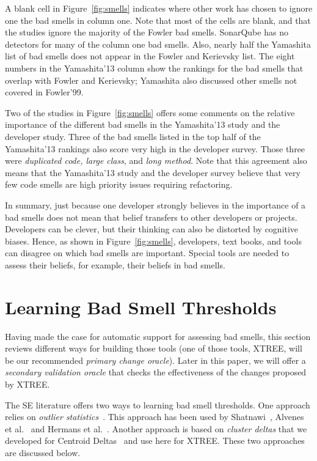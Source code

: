 \documentclass[twocolumn,5p]{elsarticle}
\newcommand{\fig}[1]{Figure~\ref{fig:#1}}
\theoremstyle{break}
\begin{document}
   
   


A  blank cell in \fig{smells}
indicates where   other work has chosen to ignore
one the   bad smells in column one. 
Note that most of the cells are blank, and that the studies ignore the majority of the Fowler bad smells.
SonarQube has no detectors for many of the column one bad smells.
Also, nearly half the Yamashita list of bad smells
    does not appear in the Fowler and Kerievsky list. The eight numbers
    in the  Yamashita'13 column show the rankings for the bad smells 
    that overlap with Fowler and Kerievsky; Yamashita also discussed other smells not covered in Fowler'99.
    

Two of the studies in \fig{smells} offers some comments on the relative importance
of the different bad smells in the Yamashita'13 study and the developer study. Three of the bad smells listed in the top half of the Yamashita'13 rankings also score very high in the developer survey. Those three were {\em duplicated code, large class}, 
        and {\em long method}. 
 Note that this agreement also means that the
  Yamashita'13 study and the developer survey   
  believe
        that very few  code smells are   high priority issues
        requiring refactoring. 
        
In summary, just because one developer strongly believes in the importance of a bad smells does not mean that belief transfers to other developers or projects.
Developers can be clever, but their thinking can also be distorted
by cognitive biases.
Hence, as shown in \fig{smells}, developers, text books, and tools 
can disagree on which bad smells are important.
Special tools are needed to assess their beliefs, for example, their beliefs in
bad smells.  
 

\section{Learning Bad Smell Thresholds}\label{sect:bst}

Having made the case for automatic support for assessing bad smells,
this section reviews different ways for building those tools (one of those tools,
XTREE, will be our recommended {\em primary change oracle}).
Later in this paper, we will offer  a {\em secondary validation oracle}
that checks the effectiveness of the changes proposed by XTREE.

The SE literature offers  two ways to 
learning bad smell thresholds.
One approach relies on 
{\em outlier statistics}~\cite{erni96,bender99}. This approach
has been used   by Shatnawi~\cite{Shatnawi10}, Alvenes et al.~\cite{Alves2010}
    and Hermans et al.~\cite{hermans15}.
    Another approach is 
    based on {\em cluster deltas} that we developed
    for   Centroid Deltas~\cite{me12c} and 
    use here for XTREE. 
    These two approaches are discussed below. 
\end{document}
